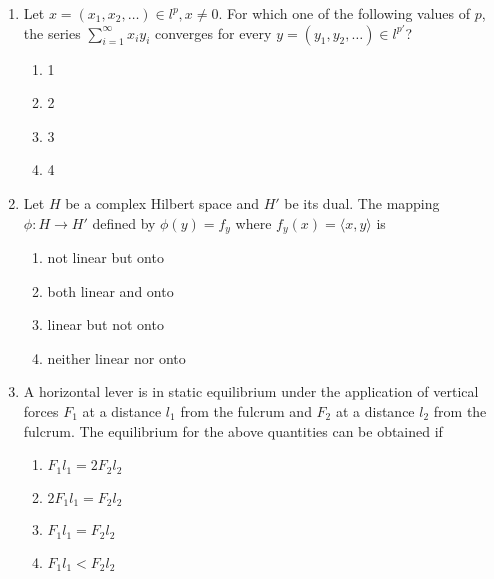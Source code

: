 \documentclass[journal]{IEEEtran}
\numberwithin{equation}{enumi}
\numberwithin{figure}{enumi}
\begin{document}
\begin{enumerate}
\item Let $x = (x_1, x_2, \dots) \in l^p, x \neq 0$. For which one of the following values of $p$, the series $\sum_{i=1}^{\infty} x_i y_i$ converges for every $y = (y_1, y_2, \dots) \in l^{p'}$?
\hfill{}
\begin{multicols}{4}
\begin{enumerate}
    \item 1
    \item 2
    \item 3
    \item 4
\end{enumerate}
\end{multicols}



\item Let $H$ be a complex Hilbert space and $H'$ be its dual. The mapping $\phi : H \to H'$ defined by $\phi(y) = f_{y}$ where $f_{y}(x) = \langle x, y \rangle$ is
\hfill{}
\begin{multicols}{2}
\begin{enumerate}
    \item not linear but onto
    \item both linear and onto
    \item linear but not onto
    \item neither linear nor onto
\end{enumerate}
\end{multicols}




\item A horizontal lever is in static equilibrium under the application of vertical forces $F_1$ at a distance $l_1$ from the fulcrum and $F_2$ at a distance $l_2$ from the fulcrum. The equilibrium for the above quantities can be obtained if
\hfill{}
\begin{multicols}{4}
\begin{enumerate}
    \item $F_1 l_1 = 2F_2 l_2$
    \item $2F_1l_1 = F_2 l_2$
    \item $F_1l_1 = F_2 l_2$
    \item $F_1l_1 < F_2 l_2$
\end{enumerate}
\end{multicols}




\end{enumerate}
\end{document}
